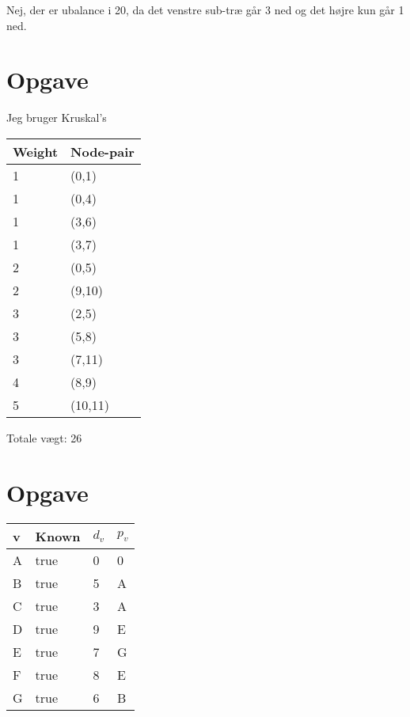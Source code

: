 \documentclass{article}
\begin{document}
Nej, der er ubalance i 20, da det venstre sub-træ går 3 ned og det højre kun går 1 ned.

\section{Opgave} %

Jeg bruger Kruskal's 
\begin{table}[H]
\centering
\begin{tabular}{|l|l|}
\hline
\rowcolor[HTML]{C0C0C0} 
Weight  & Node-pair \\ \hline
1       & (0,1)     \\ \hline
1       & (0,4)     \\ \hline
1       & (3,6)     \\ \hline
1       & (3,7)     \\ \hline
2       & (0,5)     \\ \hline
2       & (9,10)     \\ \hline
3       & (2,5)     \\ \hline
3       & (5,8)     \\ \hline
3       & (7,11)     \\ \hline
4       & (8,9)     \\ \hline
5       & (10,11)     \\ \hline
\end{tabular}
\end{table}

Totale vægt: 26

\section{Opgave} %
\begin{table}[H]
\centering
\begin{tabular}{|l|l|l|l|}
\hline
\rowcolor[HTML]{C0C0C0} 
v  & Known & $d_v$  & $p_v$     \\ \hline
A  & true  & 0      & 0    \\ \hline
B  & true  & 5      & A    \\ \hline
C  & true  & 3      & A    \\ \hline
D  & true  & 9      & E    \\ \hline
E  & true  & 7      & G    \\ \hline
F  & true  & 8      & E    \\ \hline
G  & true  & 6      & B    \\ \hline
\end{tabular}
\end{table}
\end{document}
